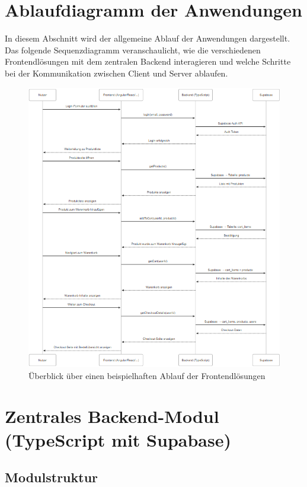 \documentclass[oneside]{ausarbeitung}
\begin{document}
\section{Ablaufdiagramm der Anwendungen}
\label{sec:ablauf}

In diesem Abschnitt wird der allgemeine Ablauf der Anwendungen dargestellt. Das folgende Sequenzdiagramm veranschaulicht, wie die verschiedenen Frontendlösungen mit dem zentralen Backend interagieren und welche Schritte bei der Kommunikation zwischen Client und Server ablaufen.


\begin{figure}[H]
    \centering
    \includegraphics[width=\textwidth]{images/sequenzdiagramm}
    \caption{Überblick über einen beispielhaften Ablauf der Frontendlösungen}
    \label{fig:applikationsstruktur}
\end{figure}

\section{Zentrales Backend-Modul (TypeScript mit Supabase)}
\subsection{Modulstruktur}
\end{document}
